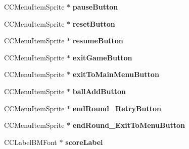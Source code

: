 \begin{DoxyCompactItemize}
\item 
\hypertarget{class_j_g___game___g_u_i_aee99def04073afd98b756ac85a858f76}{C\-C\-Menu\-Item\-Sprite $\ast$ {\bfseries pause\-Button}}\label{class_j_g___game___g_u_i_aee99def04073afd98b756ac85a858f76}

\item 
\hypertarget{class_j_g___game___g_u_i_a548c9060d30306a25a3656f11f653dfb}{C\-C\-Menu\-Item\-Sprite $\ast$ {\bfseries reset\-Button}}\label{class_j_g___game___g_u_i_a548c9060d30306a25a3656f11f653dfb}

\item 
\hypertarget{class_j_g___game___g_u_i_a3397236c35ec22aa7d8e3fcfa8d894a1}{C\-C\-Menu\-Item\-Sprite $\ast$ {\bfseries resume\-Button}}\label{class_j_g___game___g_u_i_a3397236c35ec22aa7d8e3fcfa8d894a1}

\item 
\hypertarget{class_j_g___game___g_u_i_a566545f07da25832efb00d458fc832e7}{C\-C\-Menu\-Item\-Sprite $\ast$ {\bfseries exit\-Game\-Button}}\label{class_j_g___game___g_u_i_a566545f07da25832efb00d458fc832e7}

\item 
\hypertarget{class_j_g___game___g_u_i_abebe14e53b373f190631d734fcda5813}{C\-C\-Menu\-Item\-Sprite $\ast$ {\bfseries exit\-To\-Main\-Menu\-Button}}\label{class_j_g___game___g_u_i_abebe14e53b373f190631d734fcda5813}

\item 
\hypertarget{class_j_g___game___g_u_i_a333b3b0725e8ffeb8ac1583577871712}{C\-C\-Menu\-Item\-Sprite $\ast$ {\bfseries ball\-Add\-Button}}\label{class_j_g___game___g_u_i_a333b3b0725e8ffeb8ac1583577871712}

\item 
\hypertarget{class_j_g___game___g_u_i_a14906deb34d982fac0518919b2020c6c}{C\-C\-Menu\-Item\-Sprite $\ast$ {\bfseries end\-Round\-\_\-\-Retry\-Button}}\label{class_j_g___game___g_u_i_a14906deb34d982fac0518919b2020c6c}

\item 
\hypertarget{class_j_g___game___g_u_i_a46599fe066ad468c56b0fac58fdccd1c}{C\-C\-Menu\-Item\-Sprite $\ast$ {\bfseries end\-Round\-\_\-\-Exit\-To\-Menu\-Button}}\label{class_j_g___game___g_u_i_a46599fe066ad468c56b0fac58fdccd1c}

\item 
\hypertarget{class_j_g___game___g_u_i_a53e3b8174b2ebd433cb9ed753d5e5c2c}{C\-C\-Label\-B\-M\-Font $\ast$ {\bfseries score\-Label}}\label{class_j_g___game___g_u_i_a53e3b8174b2ebd433cb9ed753d5e5c2c}


\end{DoxyCompactItemize}

